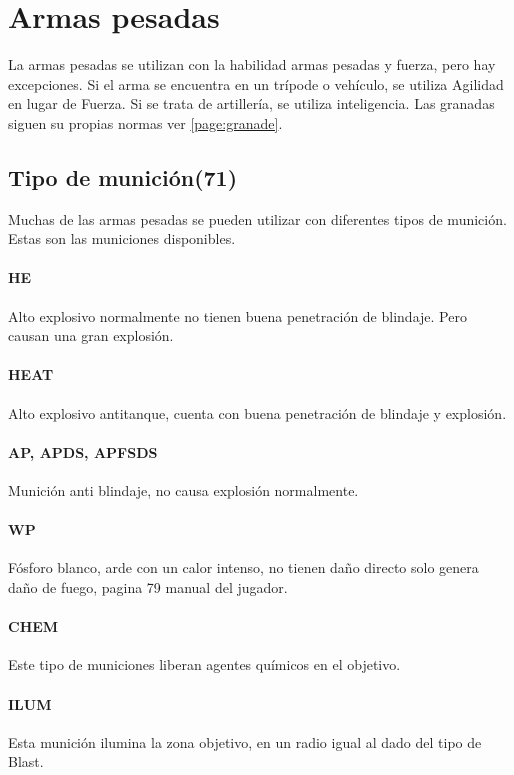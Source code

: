 \section{Armas pesadas}
    La armas pesadas se utilizan con la habilidad armas pesadas y fuerza, pero hay excepciones. Si el arma se encuentra en un trípode o vehículo, se utiliza Agilidad en lugar de Fuerza. Si se trata de artillería, se utiliza inteligencia. Las granadas siguen su propias normas ver \ref{page:granade}.

    \subsection{Tipo de munición(71)}

    Muchas de las armas pesadas se pueden utilizar con diferentes tipos de munición. Estas son las municiones disponibles.

        \paragraph{HE} Alto explosivo normalmente no tienen buena penetración de blindaje. Pero causan una gran explosión.

        \paragraph{HEAT} Alto explosivo antitanque, cuenta con buena penetración de blindaje y explosión.

        \paragraph{AP, APDS, APFSDS} Munición anti blindaje, no causa explosión normalmente.

        \paragraph{WP} Fósforo blanco, arde con un calor intenso, no tienen daño directo solo genera daño de fuego, pagina 79 manual del jugador.

        \paragraph{CHEM} Este tipo de municiones liberan agentes químicos en el objetivo.

        \paragraph{ILUM} Esta munición ilumina la zona objetivo, en un radio igual al dado del tipo de Blast.

